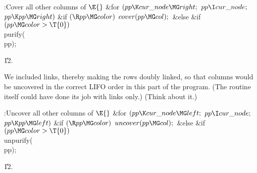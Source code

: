 \B{}:Cover all other columns of \X${}%
\E{}$\6
\&{for} ${}(\\{pp}\K\\{cur\_node}\MG\\{right};{}$ ${}\\{pp}\I\\{cur\_node};{}$
${}\\{pp}\K\\{pp}\MG\\{right}){}$\1\6
\&{if} ${}(\R\\{pp}\MG\\{color}){}$\1\5
${}\\{cover}(\\{pp}\MG\\{col});{}$\2\6
\&{else} \&{if} ${}(\\{pp}\MG\\{color}>\T{0}){}$\1\5
\\{purify}(\\{pp});\2\2\par
\U12.\fi

We included  links, thereby making the rows
doubly linked, so
that columns would be uncovered in the correct LIFO order in this
part of the program. (The  routine itself could have done its
job with  links only.) (Think about it.)

\Y\B\4:Uncover all other columns of \X${}\E{}$\6
\&{for} ${}(\\{pp}\K\\{cur\_node}\MG\\{left};{}$ ${}\\{pp}\I\\{cur\_node};{}$
${}\\{pp}\K\\{pp}\MG\\{left}){}$\1\6
\&{if} ${}(\R\\{pp}\MG\\{color}){}$\1\5
${}\\{uncover}(\\{pp}\MG\\{col});{}$\2\6
\&{else} \&{if} ${}(\\{pp}\MG\\{color}>\T{0}){}$\1\5
\\{unpurify}(\\{pp});\2\2\par
\U12.\fi

